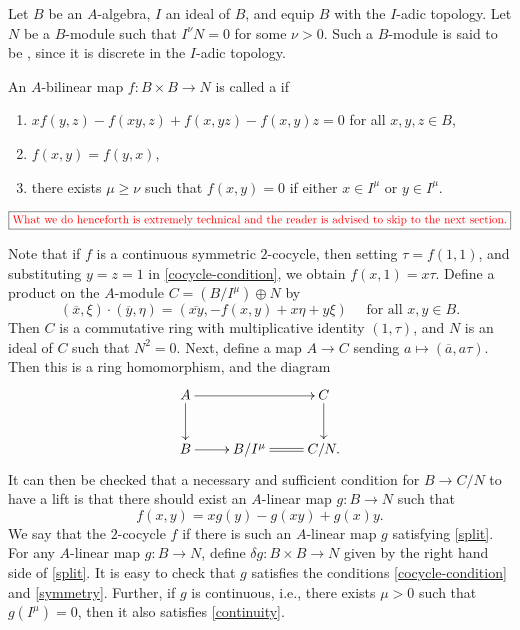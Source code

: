 \begin{definition}
    Let $B$ be an $A$-algebra, $I$ an ideal of $B$, and equip $B$ with the $I$-adic topology. Let $N$ be a $B$-module such that $I^\nu N = 0$ for some $\nu > 0$. Such a $B$-module is said to be , since it is discrete in the $I$-adic topology.

    An $A$-bilinear map $f\colon B\times B\to N$ is called a  if 
    \begin{enumerate}[label=(\roman*)]
        \item $xf(y, z) - f(xy, z) + f(x, yz) - f(x, y)z = 0$ for all $x, y, z\in B$, \label{cocycle-condition}
        \item $f(x, y) = f(y, x)$, \label{symmetry}
        \item there exists $\mu\ge\nu$ such that $f(x, y) = 0$ if either $x\in I^\mu$ or $y\in I^\mu$.\label{continuity}
    \end{enumerate}
\end{definition}

\begin{equation*}
    \boxed{\text{\textcolor{red}{What we do henceforth is extremely technical and the reader is advised to skip to the next section.}}}
\end{equation*}

Note that if $f$ is a continuous symmetric $2$-cocycle, then setting $\tau = f(1, 1)$, and substituting $y = z = 1$ in \ref{cocycle-condition}, we obtain $f(x, 1) = x\tau$. Define a product on the $A$-module $C = (B/I^\mu)\oplus N$ by 
\begin{equation*}
    (\overline x, \xi)\cdot(\overline y, \eta) = \left(\overline{xy}, - f(x, y) + x\eta + y\xi\right)\quad\text{ for all } x, y\in B.
\end{equation*}
Then $C$ is a commutative ring with multiplicative identity $(1, \tau)$, and $N$ is an ideal of $C$ such that $N^2 = 0$. Next, define a map $A\to C$ sending $a\mapsto (\overline a, a\tau)$. Then this is a ring homomorphism, and the diagram 
\begin{equation*}
    \xymatrix {
        A\ar[rr]\ar[d] & & C\ar[d]\\
        B\ar[r] & B/I^\mu\ar@{=}[r] & C/N.
    }
\end{equation*}
It can then be checked that a necessary and sufficient condition for $B\to C/N$ to have a lift is that there should exist an $A$-linear map $g\colon B\to N$ such that %
\begin{equation*}
    f(x, y) = xg(y) - g(xy) + g(x)y.\label{split}\tag{$\alpha'$}
\end{equation*}
We say that the $2$-cocycle $f$  if there is such an $A$-linear map $g$ satisfying \eqref{split}.  For any $A$-linear map $g\colon B\to N$, define $\delta g\colon B\times B\to N$ given by the right hand side of \eqref{split}. It is easy to check that $g$ satisfies the conditions \ref{cocycle-condition} and \ref{symmetry}. Further, if $g$ is continuous, i.e., there exists $\mu > 0$ such that $g(I^\mu) = 0$, then it also satisfies \ref{continuity}. %

